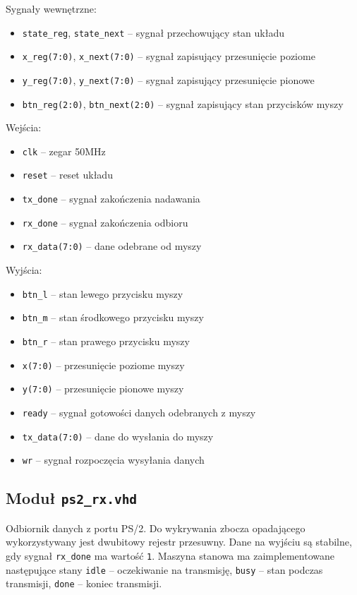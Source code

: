 Sygnały wewnętrzne:
\begin{itemize}
  \item \texttt{state\_reg}, \texttt{state\_next} -- sygnał przechowujący stan
    układu
  \item \texttt{x\_reg(7:0)}, \texttt{x\_next(7:0)} -- sygnał zapisujący
    przesunięcie poziome
  \item \texttt{y\_reg(7:0)}, \texttt{y\_next(7:0)} -- sygnał zapisujący
    przesunięcie pionowe
  \item \texttt{btn\_reg(2:0)}, \texttt{btn\_next(2:0)} -- sygnał zapisujący
    stan przycisków myszy
\end{itemize}
\vspace{1em}
Wejścia:
\begin{itemize}
  \item \texttt{clk} -- zegar 50MHz
  \item \texttt{reset} -- reset układu
  \item \texttt{tx\_done} -- sygnał zakończenia nadawania
  \item \texttt{rx\_done} -- sygnał zakończenia odbioru
  \item \texttt{rx\_data(7:0)} -- dane odebrane od myszy
\end{itemize}
\vspace{1em}
Wyjścia:
\begin{itemize}
  \item \texttt{btn\_l} -- stan lewego przycisku myszy
  \item \texttt{btn\_m} -- stan środkowego przycisku myszy
  \item \texttt{btn\_r} -- stan prawego przycisku myszy
  \item \texttt{x(7:0)} -- przesunięcie poziome myszy
  \item \texttt{y(7:0)} -- przesunięcie pionowe myszy
  \item \texttt{ready} -- sygnał gotowości danych odebranych z myszy
  \item \texttt{tx\_data(7:0)} -- dane do wysłania do myszy
  \item \texttt{wr} -- sygnał rozpoczęcia wysyłania danych
\end{itemize}

\subsection{Moduł \texttt{ps2\_rx.vhd}}
Odbiornik danych z portu PS/2. Do wykrywania zbocza opadającego wykorzystywany
jest dwubitowy rejestr przesuwny. Dane na wyjściu są stabilne, gdy sygnał
\texttt{rx\_done} ma wartość \texttt{1}. Maszyna stanowa ma zaimplementowane
następujące stany \texttt{idle} -- oczekiwanie na transmisję, \texttt{busy} --
stan podczas transmisji, \texttt{done} -- koniec transmisji.
\vspace{1em}

